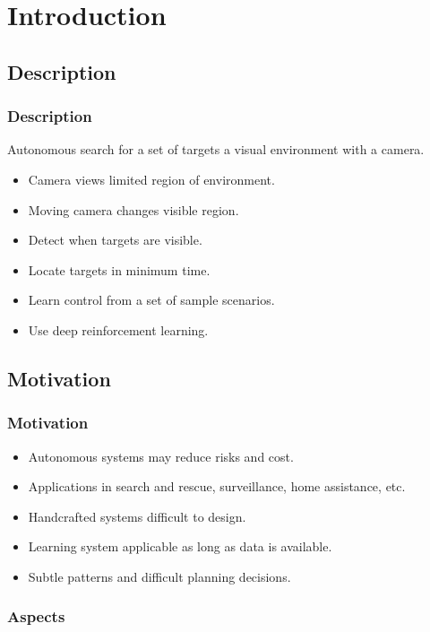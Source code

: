 
\section{Introduction}

\subsection{Description}

\begin{frame}
    \frametitle{Description}
    
    Autonomous search for a set of targets a visual environment with a camera.
    
    \begin{itemize}
        \item Camera views limited region of environment. 
        \item Moving camera changes visible region.
        \item Detect when targets are visible.
        \item Locate targets in minimum time.
        \item Learn control from a set of sample scenarios.
        \item Use deep reinforcement learning.
    \end{itemize}
\end{frame}

\subsection{Motivation}

\begin{frame}
    \frametitle{Motivation}
    
    \begin{itemize}
        \item Autonomous systems may reduce risks and cost.
        \item Applications in search and rescue, surveillance, home assistance, etc.
        \item Handcrafted systems difficult to design.
        \item Learning system applicable as long as data is available. 
        \item Subtle patterns and difficult planning decisions.
    \end{itemize}
\end{frame}

\frametitle{Aspects}

